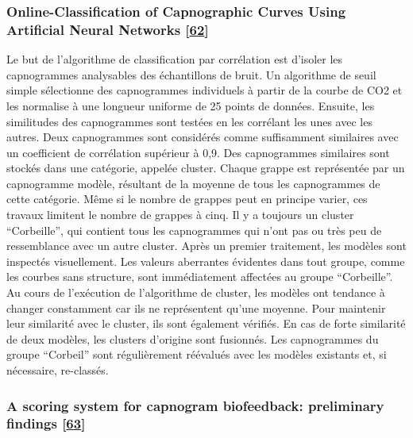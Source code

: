 \documentclass[12pt,]{article}
\begin{document}
\hypertarget{online-classification-of-capnographic-curves-using-artificial-neural-networks-bleil2009online}{%
\subsubsection{\texorpdfstring{Online-Classification of Capnographic
Curves Using Artificial Neural Networks
{[}\protect\hyperlink{ref-bleil2009online}{62}{]}}{Online-Classification of Capnographic Curves Using Artificial Neural Networks {[}62{]}}}\label{online-classification-of-capnographic-curves-using-artificial-neural-networks-bleil2009online}}

Le but de l'algorithme de classification par corrélation est d'isoler
les capnogrammes analysables des échantillons de bruit. Un algorithme de
seuil simple sélectionne des capnogrammes individuels à partir de la
courbe de CO2 et les normalise à une longueur uniforme de 25 points de
données. Ensuite, les similitudes des capnogrammes sont testées en les
corrélant les unes avec les autres. Deux capnogrammes sont considérés
comme suffisamment similaires avec un coefficient de corrélation
supérieur à 0,9. Des capnogrammes similaires sont stockés dans une
catégorie, appelée cluster. Chaque grappe est représentée par un
capnogramme modèle, résultant de la moyenne de tous les capnogrammes de
cette catégorie. Même si le nombre de grappes peut en principe varier,
ces travaux limitent le nombre de grappes à cinq. Il y a toujours un
cluster ``Corbeille'', qui contient tous les capnogrammes qui n'ont pas
ou très peu de ressemblance avec un autre cluster. Après un premier
traitement, les modèles sont inspectés visuellement. Les valeurs
aberrantes évidentes dans tout groupe, comme les courbes sans structure,
sont immédiatement affectées au groupe ``Corbeille''. Au cours de
l'exécution de l'algorithme de cluster, les modèles ont tendance à
changer constamment car ils ne représentent qu'une moyenne. Pour
maintenir leur similarité avec le cluster, ils sont également vérifiés.
En cas de forte similarité de deux modèles, les clusters d'origine sont
fusionnés. Les capnogrammes du groupe ``Corbeil'' sont régulièrement
réévalués avec les modèles existants et, si nécessaire, re-classés.

\hypertarget{a-scoring-system-for-capnogram-biofeedback-preliminary-findings-landis1998scoring}{%
\subsubsection{\texorpdfstring{A scoring system for capnogram
biofeedback: preliminary findings
{[}\protect\hyperlink{ref-landis1998scoring}{63}{]}}{A scoring system for capnogram biofeedback: preliminary findings {[}63{]}}}\label{a-scoring-system-for-capnogram-biofeedback-preliminary-findings-landis1998scoring}}
\end{document}
